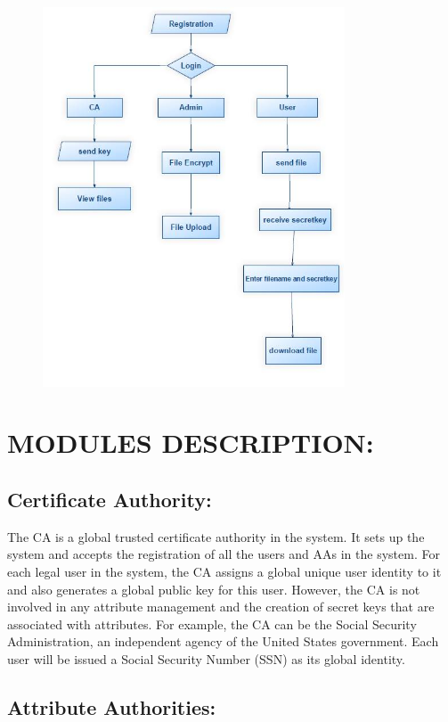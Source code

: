 \documentclass[11pt,a4paper]{report}
\begin{document}
\begin{figure}
\centering
\includegraphics[width=0.8\textwidth]{dsf.png}
\caption{\label{fig:}}
\end{figure}

\section{MODULES DESCRIPTION:}
\subsection{Certificate Authority:}

The CA is a global trusted
certificate authority in the system. It sets up the
system and accepts the registration of all the users and
AAs in the system. For each legal user in the system,
the CA assigns a global unique user identity to it and
also generates a global public key for this user.
However, the CA is not involved in any attribute
management and the creation of secret keys that are
associated with attributes. For example, the CA can be
the Social Security Administration, an independent
agency of the United States government. Each user
will be issued a Social Security Number (SSN) as its
global identity.


\subsection{Attribute Authorities:}
\end{document}
